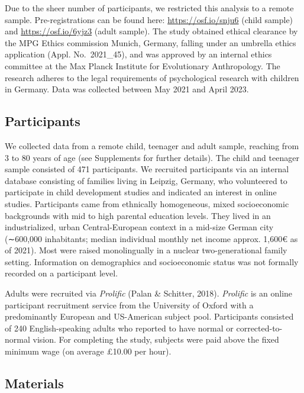 \documentclass[
  man,mask,floatsintext]{apa6}
\begin{document}
Due to the sheer number of participants, we restricted this analysis to a remote sample. Pre-registrations can be found here: \url{https://osf.io/snju6} (child sample) and \url{https://osf.io/6yjz3} (adult sample). The study obtained ethical clearance by the MPG Ethics commission Munich, Germany, falling under an umbrella ethics application (Appl. No.~2021\_45), and was approved by an internal ethics committee at the Max Planck Institute for Evolutionary Anthropology. The research adheres to the legal requirements of psychological research with children in Germany. Data was collected between May 2021 and April 2023.

\hypertarget{participants}{%
\subsection{Participants}\label{participants}}

We collected data from a remote child, teenager and adult sample, reaching from 3 to 80 years of age (see Supplements for further details). The child and teenager sample consisted of 471 participants. We recruited participants via an internal database consisting of families living in Leipzig, Germany, who volunteered to participate in child development studies and indicated an interest in online studies. Participants came from ethnically homogeneous, mixed socioeconomic backgrounds with mid to high parental education levels. They lived in an industrialized, urban Central-European context in a mid-size German city (∼600,000 inhabitants; median individual monthly net income approx. 1,600€ as of 2021). Most were raised monolingually in a nuclear two-generational family setting. Information on demographics and socioeconomic status was not formally recorded on a participant level.

Adults were recruited via \emph{Prolific} (Palan \& Schitter, 2018). \emph{Prolific} is an online participant recruitment service from the University of Oxford with a predominantly European and US-American subject pool. Participants consisted of 240 English-speaking adults who reported to have normal or corrected-to-normal vision. For completing the study, subjects were paid above the fixed minimum wage (on average £10.00 per hour).

\hypertarget{materials}{%
\subsection{Materials}\label{materials}}
\end{document}
